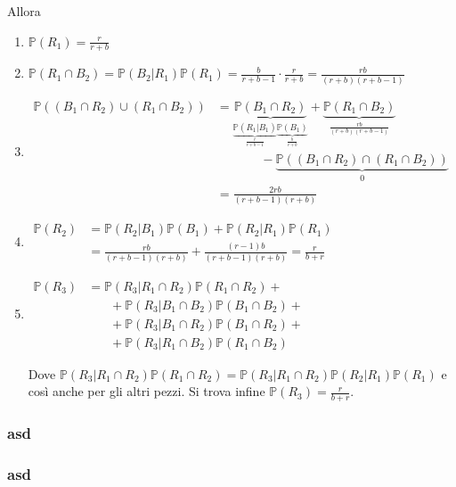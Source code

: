 Allora
\begin{enumerate}
\item $\mathbb{P}( R_{1}) =\frac{r}{r+b}$
\item $\mathbb{P}( R_{1} \cap B_{2}) =\mathbb{P}( B_{2} |R_{1})\mathbb{P}( R_{1}) =\frac{b}{r+b-1} \cdotp \frac{r}{r+b} =\frac{rb}{( r+b)( r+b-1)}$
\item $\begin{aligned}
\mathbb{P}(( B_{1} \cap R_{2}) \cup ( R_{1} \cap B_{2})) & =\underbrace{\mathbb{P}( B_{1} \cap R_{2})}_{\underbrace{\mathbb{P}( R_{1} |B_{1})}_{\frac{r}{r+b-1}}\underbrace{\mathbb{P}( B_{1})}_{\frac{b}{r+b}}} +\underbrace{\mathbb{P}( R_{1} \cap B_{2})}_{\frac{rb}{( r+b)( r+b-1)}}\\
 & \ \ \ \ \ \ \ \ \ \ \ \ \ \ \ \ -\underbrace{\mathbb{P}(( B_{1} \cap R_{2}) \cap ( R_{1} \cap B_{2}))}_{0}\\
 & =\frac{2rb}{( r+b-1)( r+b)}
\end{aligned}$
\item $\begin{aligned}
\mathbb{P}( R_{2}) & =\mathbb{P}( R_{2} |B_{1})\mathbb{P}( B_{1}) +\mathbb{P}( R_{2} |R_{1})\mathbb{P}( R_{1})\\
 & =\frac{rb}{( r+b-1)( r+b)} +\frac{( r-1) b}{( r+b-1)( r+b)} =\frac{r}{b+r}
\end{aligned}$
\item $\begin{aligned}
\mathbb{P}( R_{3}) & =\mathbb{P}( R_{3} |R_{1} \cap R_{2})\mathbb{P}( R_{1} \cap R_{2}) +\\
 & \ \ \ \ \ \ \ \ +\mathbb{P}( R_{3} |B_{1} \cap B_{2})\mathbb{P}( B_{1} \cap B_{2}) +\\
 & \ \ \ \ \ \ \ \ +\mathbb{P}( R_{3} |B_{1} \cap R_{2})\mathbb{P}( B_{1} \cap R_{2}) +\\
 & \ \ \ \ \ \ \ \ +\mathbb{P}( R_{3} |R_{1} \cap B_{2})\mathbb{P}( R_{1} \cap B_{2})
\end{aligned}$

Dove $\mathbb{P}( R_{3} |R_{1} \cap R_{2})\mathbb{P}( R_{1} \cap R_{2}) =\mathbb{P}( R_{3} |R_{1} \cap R_{2})\mathbb{P}( R_{2} |R_{1})\mathbb{P}( R_{1})$ e così anche per gli altri pezzi. Si trova infine $\mathbb{P}( R_{3}) =\frac{r}{b+r}$.
\end{enumerate}
\subsubsection{asd}
\subsubsection{asd}

